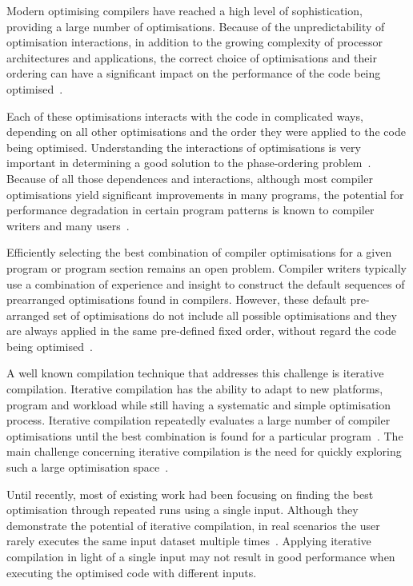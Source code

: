 \documentclass[sigplan,9pt]{acmart}
\newcommand{\itercomp}{{iterative compilation}}
\newcommand{\Itercomp}{{Iterative compilation}}
\begin{document}
Modern optimising compilers
have reached a high level of sophistication,
providing a large number of optimisations.
Because of the unpredictability of optimisation
interactions, in addition to the growing complexity
of processor architectures and applications,
the correct choice of optimisations and their ordering
can have a significant impact on the performance of the
code being optimised~\cite{pan06,fursin07,kulkarni12}.

Each of these optimisations interacts with the code in complicated ways,
depending on all other optimisations and the order they were applied to
the code being optimised.
Understanding the interactions of optimisations is very important
in determining a good solution to the phase-ordering problem~\cite{touati06,kulkarni12}.
Because of all those dependences and interactions, although
most compiler optimisations yield significant improvements
in many programs, the potential for performance degradation in
certain program patterns is known to compiler writers and many users~\cite{pan06,zhou12,kulkarni12}.

Efficiently selecting the best combination of compiler optimisations
for a given program or program section remains an open problem.
Compiler writers typically use a combination of experience and insight to construct
the default sequences of prearranged optimisations found in compilers.
However, these default pre-arranged set of optimisations do not include all possible optimisations
and they are always applied in the same pre-defined fixed order, without regard the code being optimised~\cite{pan06,cavazos07,zhou12,kulkarni12}.

A well known compilation technique that
addresses this challenge is {\itercomp}.
{\Itercomp} has the ability to adapt to new
platforms, program and workload while still
having a systematic and simple optimisation process.
{\Itercomp} repeatedly evaluates a large number
of compiler optimisations until the best combination is
found for a particular program~\cite{fursin07,chen10}.
The main challenge concerning {\itercomp} is the need for quickly
exploring such a large optimisation space~\cite{fursin07,cavazos07,zhou12}.

Until recently, most of existing work  had been focusing
on finding the best optimisation through repeated runs using a single input.
Although they demonstrate the potential of {\itercomp},
in real scenarios the user rarely executes the same input dataset multiple times~\cite{bodin98,kisuki99,stephenson03,kulkarni04,agakov06}.
Applying {\itercomp} in light of a single input may not result in good performance when executing the optimised code with different inputs.
\end{document}

